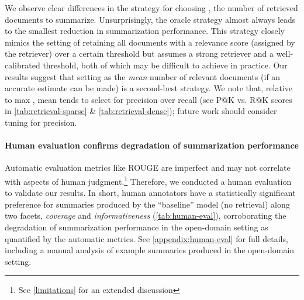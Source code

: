 \documentclass[11pt]{article}
\begin{document}
We observe clear differences in the strategy for choosing , the number of retrieved documents to summarize. Unsurprisingly, the oracle strategy almost always leads to the smallest reduction in summarization performance. This strategy closely mimics the setting of retaining all documents with a relevance score (assigned by the retriever) over a certain threshold but assumes a strong retriever and a well-calibrated threshold, both of which may be difficult to achieve in practice. Our results suggest that setting  as the \textit{mean} number of relevant documents (if an accurate estimate can be made) is a second-best strategy. We note that, relative to max , mean  tends to select for precision over recall (see P@K vs. R@K scores in \autoref{tab:retrieval-sparse} \& \autoref{tab:retrieval-dense}); future work should consider tuning  for precision.

\paragraph{Human evaluation confirms degradation of summarization performance}

Automatic evaluation metrics like ROUGE are imperfect and may not correlate with aspects of human judgment.\footnote{See \textsection \ref{limitations} for an extended discussion} Therefore, we conducted a human evaluation to validate our results. In short, human annotators have a statistically significant preference for summaries produced by the ``baseline'' model (no retrieval) along two facets, \textit{coverage} and \textit{informativeness} (\autoref{tab:human-eval}), corroborating the degradation of summarization performance in the open-domain setting as quantified by the automatic metrics. See \autoref{appendix:human-eval} for full details, including a manual analysis of example summaries produced in the open-domain setting.

\begin{table}[t]
\centering
\caption{Human evaluation on Multi-News. A binomial test on three human annotators for  random test examples was conducted for each facet (excluding ties). All results \underline{statistically significant} (p~~0.01). Inter-annotator agreement reported as Fleiss' Kappa (.}
\label{tab:human-eval}
\vspace{-3.5mm}
\end{table}
\end{document}
